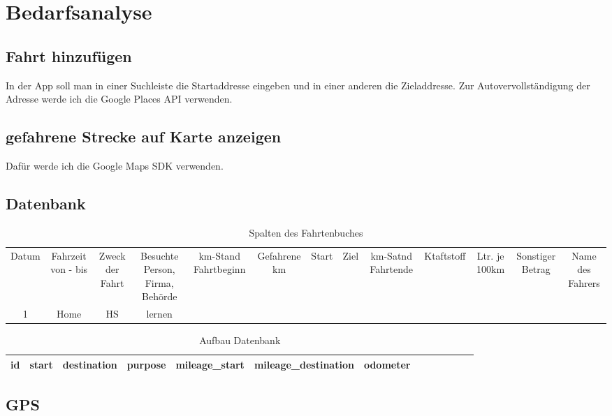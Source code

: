 \documentclass[a4paper]{article}
\begin{document}


\section{Bedarfsanalyse}

\subsection{Fahrt hinzufügen}
In der App soll man in einer Suchleiste die Startaddresse eingeben und in einer anderen die Zieladdresse.
Zur Autovervollständigung der Adresse werde ich die Google Places API verwenden.

\subsection{gefahrene Strecke auf Karte anzeigen}
Dafür werde ich die Google Maps SDK verwenden.

\subsection{Datenbank}

 \begin{table}
	\caption{Spalten des Fahrtenbuches}
    \centering
	\begin{tabular}{c c c c c c c c c c c c c}
		\hline
		Datum & Fahrzeit von - bis & Zweck der Fahrt  & Besuchte Person, Firma, Behörde &
		km-Stand Fahrtbeginn & Gefahrene km & Start & Ziel & km-Satnd Fahrtende & Ktaftstoff &
		Ltr. je 100km & Sonstiger Betrag & Name des Fahrers\\ [0.5ex]
		1 & Home & HS & lernen \\ [1ex]
		\hline
	\end{tabular}
	\label{table:nonlin}
 \end{table}

 \begin{table}
	\caption{Aufbau Datenbank}
    \centering
	\begin{tabular}{c c c c c c c c c c c c c}
		\hline
        id & start & destination & purpose & mileage_start & mileage_destination & odometer \\ [1ex]
		\hline
	\end{tabular}
	\label{table:nonlin}
 \end{table}

\subsection{GPS}
\end{document}
